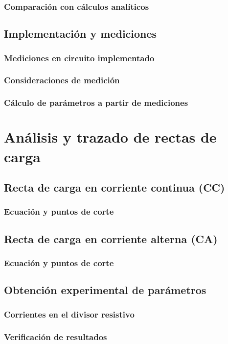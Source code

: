 \documentclass[chaptersright]{informeutn}
\begin{document}
    \subsection{Comparación con cálculos analíticos}
  \section{Implementación y mediciones}
    \subsection{Mediciones en circuito implementado}
    \subsection{Consideraciones de medición}
    \subsection{Cálculo de parámetros a partir de mediciones}

\chapter{Análisis y trazado de rectas de carga}
  \section{Recta de carga en corriente continua (CC)}
    \subsection{Ecuación y puntos de corte}
  \section{Recta de carga en corriente alterna (CA)}
    \subsection{Ecuación y puntos de corte}
  \section{Obtención experimental de parámetros}
    \subsection{Corrientes en el divisor resistivo}
    \subsection{Verificación de resultados}
\end{document}
